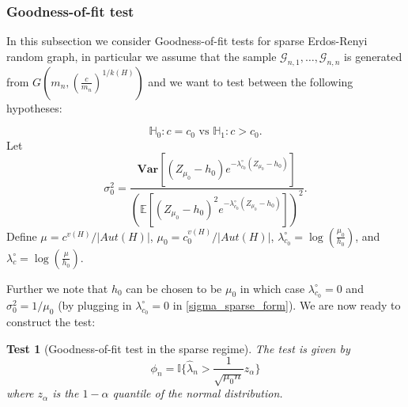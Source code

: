 \documentclass[12pt]{article}
\def\H{\mathbb{H}}
\numberwithin{equation}{section}
\newtheorem{test}{Test}[section]
\begin{document}




\subsubsection{Goodness-of-fit test}

In this subsection we consider Goodness-of-fit tests for sparse Erdos-Renyi random graph, in particular we assume that the sample $\mathcal{G}_{n,1}, \ldots, \mathcal{G}_{n,n}$ is generated from $G\left(m_n, (\frac{c}{m_n})^{1/k(H)}\right)$ and we want to test between the following hypotheses:

\begin{equation}
\H_0: c=c_0 \text{ vs } \H_1: c>c_0. 
\end{equation}
 Let 
\begin{equation}\sigma^2_0=\frac{\mathbf{Var}\left[(Z_{\mu_0}-h_0)e^{-\lambda^{\circ}_{c_0}(Z_{\mu_0}-h_0)}\right]}{\left(\mathbb{E}\left[(Z_{\mu_0}-h_0)^2e^{-\lambda^{\circ}_{c_0}(Z_{\mu_0}-h_0)}\right]\right)^2}.\label{sigma_sparse_form}\end{equation}
Define $\mu=c^{v(H)}/\lvert Aut(H)\rvert$, $\mu_0=c_0^{v(H)}/\lvert Aut(H)\rvert$, $\lambda^{\circ}_{c_0} = \log\left(\frac{\mu_0}{h_0}\right)$, and $\lambda^{\circ}_c = \log\left(\frac{\mu}{h_0}\right)$. 



Further we note that $h_0$ can be chosen to be $\mu_0$ in which case $\lambda^{\circ}_{c_0}=0$ and $\sigma^2_0=1/\mu_0$ (by plugging in $\lambda^{\circ}_{c_0}=0$ in \eqref{sigma_sparse_form}).
We are now ready to construct the test:

\begin{test}[Goodness-of-fit test in the sparse regime]{\label{gof_sparse}} The test is given by 
\[\phi_{n}=\mathbb{I}\{\hat{\lambda}_n>\frac{1}{\sqrt{\mu_0n}}z_{\alpha}\}\]
where $z_{\alpha}$ is the $1-\alpha$ quantile of the normal distribution.  
\end{test}
\end{document}
